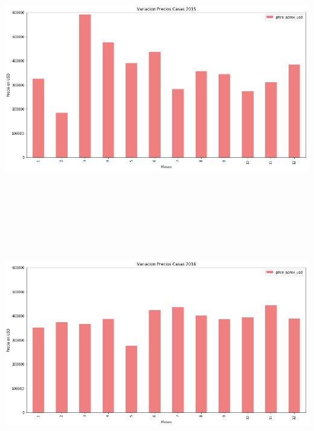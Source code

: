 \documentclass[a4paper, 10pt]{article}
\begin{document}
      \begin{center}
            \includegraphics[width=6in, height=4.2in]{images/vCasas2015}
      \end{center}
      \begin{center}
            \includegraphics[width=6in, height=4.2in]{images/vCasas2016}
      \end{center}
\end{document}
